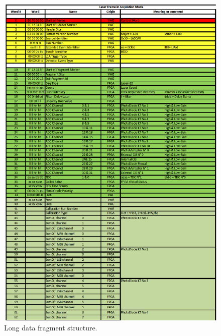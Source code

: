 \begin{appendices}
\begin{figure}[htbp]
\centering
\includegraphics[width=14cm]{figures/long_fragment_new_1.pdf}
\caption{Long data fragment structure.}\label{fig:longfraga}
\end{figure}


\end{appendices}
